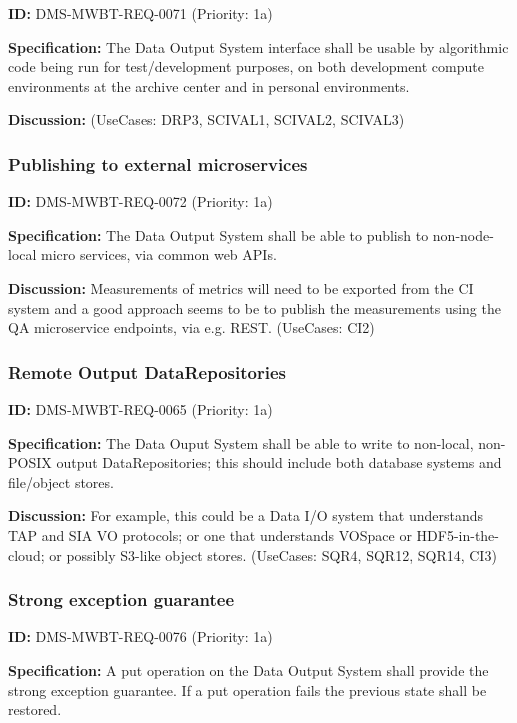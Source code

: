 \documentclass[SE,toc,lsstdraft]{lsstdoc}
\begin{document}
\label{DMS-MWBT-REQ-0071}
\textbf{ID:} DMS-MWBT-REQ-0071 (Priority: 1a)

\textbf{Specification:}
The Data Output System interface shall be usable by algorithmic code being run for test/development purposes, on both development compute environments at the archive center and in personal environments.

\textbf{Discussion:}
(UseCases: DRP3, SCIVAL1, SCIVAL2, SCIVAL3)

\subsubsection{Publishing to external microservices}

\label{DMS-MWBT-REQ-0072}
\textbf{ID:} DMS-MWBT-REQ-0072 (Priority: 1a)

\textbf{Specification:}
The Data Output System shall be able to publish to non-node-local micro services, via common web APIs.

\textbf{Discussion:}
Measurements of metrics will need to be exported from the CI system and a good approach seems to be to publish the measurements using the QA microservice endpoints, via e.g. REST. (UseCases: CI2)

\subsubsection{Remote Output DataRepositories}

\label{DMS-MWBT-REQ-0065}
\textbf{ID:} DMS-MWBT-REQ-0065 (Priority: 1a)

\textbf{Specification:}
The Data Ouput System shall be able to write to non-local, non-POSIX output DataRepositories; this should include both database systems and file/object stores.

\textbf{Discussion:}
For example, this could be a Data I/O system that understands TAP and SIA VO protocols; or one that understands VOSpace or HDF5-in-the-cloud; or possibly S3-like object stores. (UseCases: SQR4, SQR12, SQR14, CI3)

\subsubsection{Strong exception guarantee}

\label{DMS-MWBT-REQ-0076}
\textbf{ID:} DMS-MWBT-REQ-0076 (Priority: 1a)

\textbf{Specification:}
A put operation on the Data Output System shall provide the strong exception guarantee. If a put operation fails the previous state shall be restored.
\end{document}
